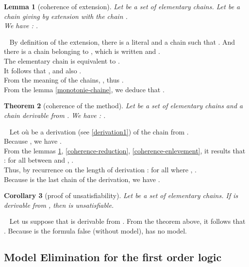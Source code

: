 \documentclass{article}
\newtheorem{theoreme}{Theorem}\newtheorem{lemme}[theoreme]{Lemma}
\newtheorem{corollaire}[theoreme]{Corollary}
\newenvironment{preuve}{\noindent {\em Proof :}\ }{{\hfill
    }\vspace{.5pc}} \newcommand{\sg}{\!\!<\!\!}
\begin{document}
\begin{lemme}[coherence of extension]\label{coherence-expansion}
Let  be a set of elementary chains. Let  be a chain giving by extension with  the chain .\\
We have : .
\end{lemme}

\begin{preuve}
By definition of the extension, there is a literal  and a chain  such that .
And there is a chain belonging to , which is written   and  .\\
The elementary chain  is equivalent to .\\
It follows that , and also 
.\\
From the meaning of the chains, , thus 
.\\ 
From the lemma \ref{monotonie-chaine}, we deduce that .
\end{preuve}


\begin{theoreme}[coherence of the method]
Let  be a set of elementary chains and  a chain derivable from .
We have : .
\end{theoreme}

\begin{preuve}
Let  où  be a derivation (see \ref{derivation1}) of the chain  from .\\
Because , we have .\\
From the lemmas \ref{coherence-expansion}, \ref{coherence-reduction}, \ref{coherence-enlevement}, it results that :
for all  between  and , .\\
Thus, by recurrence on the length of derivation  :
for all  where , .\\
Because  is the last chain of the derivation, we have .
\end{preuve}

\begin{corollaire}[proof of unsatisfiability]\label{coherence-ME}
Let  be a set of elementary chains. If  is derivable from , then  is unsatisfiable.
\end{corollaire}

\begin{preuve}
Let us suppose that  is derivable from . From the theorem above, it follows that .
Because  is the formula false (without model),  has no model.
\end{preuve}


\subsection{Model Elimination for the first order logic}
\end{document}
